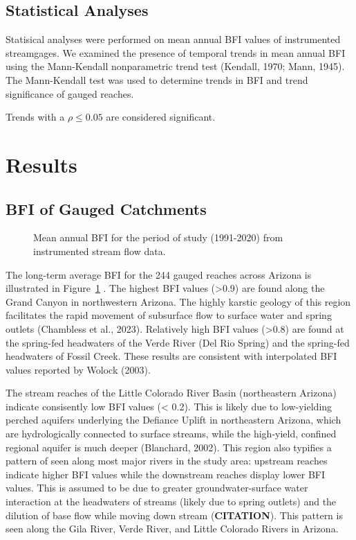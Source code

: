 \documentclass[
]{agujournal2019}
\begin{document}
\subsection{Statistical Analyses}\label{statistical-analyses}

Statisical analyses were performed on mean annual BFI values of
instrumented streamgages. We examined the presence of temporal trends in
mean annual BFI using the Mann-Kendall nonparametric trend test
(Kendall, 1970; Mann, 1945). The Mann-Kendall test was used to determine
trends in BFI and trend significance of gauged reaches.

Trends with a \(\rho \le 0.05\) are considered significant.

\section{Results}\label{results}

\subsection{BFI of Gauged Catchments}\label{bfi-of-gauged-catchments}

\begin{figure}


\caption{\label{fig-instrumented-bfi}Mean annual BFI for the period of
study (1991-2020) from instrumented stream flow data.}

\end{figure}%

The long-term average BFI for the 244 gauged reaches across Arizona is
illustrated in Figure~\ref{fig-instrumented-bfi} . The highest BFI
values (\textgreater0.9) are found along the Grand Canyon in
northwestern Arizona. The highly karstic geology of this region
facilitates the rapid movement of subsurface flow to surface water and
spring outlets (Chambless et al., 2023). Relatively high BFI values
(\textgreater0.8) are found at the spring-fed headwaters of the Verde
River (Del Rio Spring) and the spring-fed headwaters of Fossil Creek.
These results are consistent with interpolated BFI values reported by
Wolock (2003).

The stream reaches of the Little Colorado River Basin (northeastern
Arizona) indicate consisently low BFI values (\textless{} 0.2). This is
likely due to low-yielding perched aquifers underlying the Defiance
Uplift in northeastern Arizona, which are hydrologically connected to
surface streams, while the high-yield, confined regional aquifer is much
deeper (Blanchard, 2002). This region also typifies a pattern of seen
along most major rivers in the study area: upstream reaches indicate
higher BFI values while the downstream reaches display lower BFI values.
This is assumed to be due to greater groundwater-surface water
interaction at the headwaters of streams (likely due to spring outlets)
and the dilution of base flow while moving down stream
(\textbf{CITATION}). This pattern is seen along the Gila River, Verde
River, and Little Colorado Rivers in Arizona.
\end{document}

